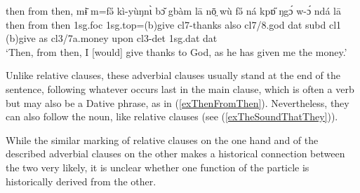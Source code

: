 \documentclass[10pt,twoside]{article}
\newcommand{\gl}[1]{`#1'}
\def\VSP{\vspace{0pt}}
\newcommand{\cl}[1]{{\sc cl#1}}
\newcommand{\pref}[1]{(\ref{#1})}
\def\elicited{$^\diamond$}
\def\ih{ɩ}
\begin{document}
\begin{exe} 
	\ex \label{exThenFromThen}	
		\gll	then from then, mɨ̄ m=fə̋ kì-yùŋn{\`\ih} bɔ̌ gbàm lā nō̤ wù fə̋ ná kpɒ̋ ŋgɔ́ w-ɔ́ ndá lā			\\
			then from then {\sc 1sg.foc} {\sc 1sg.top}=({\sc b})give \cl7-thanks also \cl7/8.god {\sc dat} {\sc subd} \cl1 ({\sc b})give  as \cl3/7a.money upon \cl3-{\sc det} {\sc 1sg.dat} {\sc dat}		\\
		\glt \VSP \gl{Then, from then, I [would] give thanks to God, as he has given me the money.}
\end{exe}%
%

Unlike relative clauses, these adverbial clauses usually stand at the end 
of the sentence, following whatever occurs last in the main clause, which is often a verb but 
may also be a Dative phrase, as in \pref{exThenFromThen}. Nevertheless, they can also follow the noun, like relative clauses (see \pref{exTheSoundThatThey}).

While the similar marking of 
relative clauses on the one hand and of the described adverbial clauses on the other makes a 
historical connection between the two very likely, it is unclear whether one function of the
particle is historically derived from the other.
\end{document}
